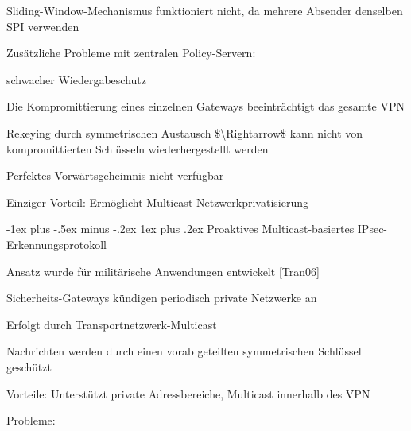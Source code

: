 \documentclass[a4paper]{article}
\makeatletter
\renewcommand{\subsubsection}{\@startsection{subsubsection}{3}{0mm}%
 {-1ex plus -.5ex minus -.2ex}%
 {1ex plus .2ex}%
 {\normalfont\small\bfseries}}
\makeatother
\begin{document}
\begin{multicols}{3}
\begin{itemize*}
\begin{itemize*}
                  \begin{itemize*}
                        \item Sliding-Window-Mechanismus funktioniert nicht, da mehrere Absender denselben SPI verwenden
                  \end{itemize*}
                  \item
                  Zusätzliche Probleme mit zentralen Policy-Servern:

                  \begin{itemize*}
                        \item schwacher Wiedergabeschutz
                        \item Die Kompromittierung eines einzelnen Gateways beeinträchtigt das gesamte VPN
                        \item Rekeying durch symmetrischen Austausch \$\textbackslash Rightarrow\$ kann nicht von kompromittierten Schlüsseln wiederhergestellt werden
                        \item Perfektes Vorwärtsgeheimnis nicht verfügbar
                  \end{itemize*}
                  \item
                  Einziger Vorteil: Ermöglicht Multicast-Netzwerkprivatisierung
            \end{itemize*}


            \subsubsection{Proaktives Multicast-basiertes
                  IPsec-Erkennungsprotokoll}

            \begin{itemize*}
                  \item
                  Ansatz wurde für militärische Anwendungen entwickelt {[}Tran06{]}
                  \item
                  Sicherheits-Gateways kündigen periodisch private Netzwerke an
                  \item
                  Erfolgt durch Transportnetzwerk-Multicast
                  \item
                  Nachrichten werden durch einen vorab geteilten symmetrischen Schlüssel
                  geschützt
                  \item
                  Vorteile: Unterstützt private Adressbereiche, Multicast innerhalb des
                  VPN
                  \item
                  Probleme:


\end{itemize*}
\end{itemize*}
\end{multicols}
\end{document}
